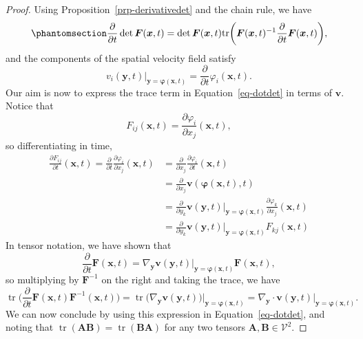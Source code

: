 \documentclass[
  letterpaper,
  DIV=11,
  numbers=noendperiod]{scrreprt}
\theoremstyle{plain}
\theoremstyle{remark}
\begin{document}
\begin{proof}
Using Proposition~\ref{prp-derivativedet} and the chain rule, we have
\begin{equation}\phantomsection\label{eq-dotdet}{
    \frac{\partial}{\partial t}\det{\boldsymbol{F}}({\boldsymbol{x}},t) = \det{\boldsymbol{F}}({\boldsymbol{x}},t) {\operatorname{tr}}\bigg({\boldsymbol{F}}({\boldsymbol{x}},t)^{-1}\frac{\partial}{\partial t}{\boldsymbol{F}}({\boldsymbol{x}},t)\bigg),
}\end{equation} and the components of the spatial velocity field satisfy
\[v_i({\boldsymbol{y}},t)\bigg|_{{\boldsymbol{y}}={\boldsymbol{\varphi}}({\boldsymbol{x}},t)} = \frac{\partial}{\partial t}\varphi_i({\boldsymbol{x}},t).\]
Our aim is now to express the trace term in Equation~\ref{eq-dotdet} in
terms of \({\boldsymbol{v}}\). Notice that
\[F_{ij}({\boldsymbol{x}},t) = \frac{\partial \varphi_i}{\partial x_j}({\boldsymbol{x}},t),\]
so differentiating in time, \[\begin{aligned}
    \frac{\partial F_{ij}}{\partial t}({\boldsymbol{x}},t) = \frac{\partial}{\partial t} \frac{\partial \varphi_i}{\partial x_j}({\boldsymbol{x}},t) &= \frac{\partial}{\partial x_j} \frac{\partial \varphi_i}{\partial t}({\boldsymbol{x}},t) \\
    &= \frac{\partial}{\partial x_j}{\boldsymbol{v}}({\boldsymbol{\varphi}}({\boldsymbol{x}},t),t)\\
    &= \frac{\partial}{\partial y_k}{\boldsymbol{v}}({\boldsymbol{y}},t)\bigg|_{{\boldsymbol{y}}={\boldsymbol{\varphi}}({\boldsymbol{x}},t)}\frac{\partial \varphi_k}{\partial x_j}({\boldsymbol{x}},t)\\
    &= \frac{\partial}{\partial y_k}{\boldsymbol{v}}({\boldsymbol{y}},t)\bigg|_{{\boldsymbol{y}}={\boldsymbol{\varphi}}({\boldsymbol{x}},t)}F_{kj}({\boldsymbol{x}},t)
  \end{aligned}\] In tensor notation, we have shown that
\[\frac{\partial}{\partial t}{\boldsymbol{F}}({\boldsymbol{x}},t) = \nabla_{\boldsymbol{y}}{\boldsymbol{v}}({\boldsymbol{y}},t)\bigg|_{{\boldsymbol{y}}={\boldsymbol{\varphi}}({\boldsymbol{x}},t)}{\boldsymbol{F}}({\boldsymbol{x}},t),\]
so multiplying by \({\boldsymbol{F}}^{-1}\) on the right and taking the
trace, we have
\[{\operatorname{tr}}\bigg(\frac{\partial}{\partial t}{\boldsymbol{F}}({\boldsymbol{x}},t){\boldsymbol{F}}^{-1}({\boldsymbol{x}},t)\bigg) =
  {\operatorname{tr}}\big(\nabla_{\boldsymbol{y}}{\boldsymbol{v}}({\boldsymbol{y}},t)\big)\bigg|_{{\boldsymbol{y}}= {\boldsymbol{\varphi}}({\boldsymbol{x}},t)} = \nabla_{\boldsymbol{y}}\cdot {\boldsymbol{v}}({\boldsymbol{y}},t)\bigg|_{{\boldsymbol{y}}= {\boldsymbol{\varphi}}({\boldsymbol{x}},t)}.\]
We can now conclude by using this expression in
Equation~\ref{eq-dotdet}, and noting that
\({\operatorname{tr}}({\boldsymbol{A}}{\boldsymbol{B}})={\operatorname{tr}}({\boldsymbol{B}}{\boldsymbol{A}})\)
for any two tensors
\({\boldsymbol{A}},{\boldsymbol{B}}\in{\mathcal{V}}^2\).
\end{proof}
\end{document}
